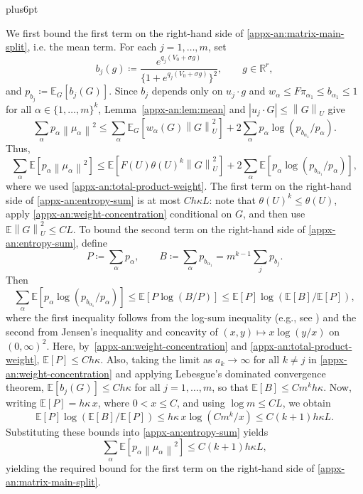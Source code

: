 \documentclass[11pt,letterpaper,twoside,leqno]{article}
\makeatletter
\theoremstyle{bookplain}
\theoremstyle{bookremark}
\renewenvironment{proof}[1][\proofname]{\par
  \pushQED{\qed}\normalfont\topsep6pt plus6pt\relax
  \trivlist\item[\hskip\labelsep\bfseries #1\@addpunct{.}]\ignorespaces
}{\popQED\endtrivlist\@endpefalse}
\newcommand{\E}{\mathbb E}
\newcommand{\R}{\mathbb R}
\newcommand{\norm}[1]{\left\lVert#1\right\rVert}
\makeatother
\begin{document}
\begin{proof}
We first bound the first term on the right-hand side of \eqref{appx-an:matrix-main-split}, i.e. the mean term.
For each $j=1,\dots, m$, set
\[
 b_j(g)\coloneqq
 \frac{e^{q_j(V_0+\sigma g)}}
 {\{1+e^{q_j(V_0+\sigma g)}\}^2},
 \qquad g\in\R^r,
 \]
 and \(p_{b_j}\coloneqq\E_G[b_j(G)]\).
Since $b_j$ depends only on $u_j\cdot g$ and
$w_\alpha\le F\pi_{\alpha_1}\le b_{\alpha_1}\leq 1$ for all $\alpha\in\{1,\dots, m\}^k$,
Lemma~\ref{appx-an:lem:mean} and
$|u_j\cdot G|\le\norm G_U$ give
\[
 \sum_\alpha p_\alpha\norm{\mu_\alpha}^2
 \le \sum_{\alpha}\E_G[w_{\alpha}(G)\norm G_U^2]
 +2\sum_\alpha p_\alpha
 \log(p_{b_{\alpha_1}}/p_\alpha).
\] 
Thus,
\begin{equation}
\sum_\alpha \E[p_\alpha\norm{\mu_\alpha}^2]
 \le \E[F(U)\theta(U)^k\norm G_U^2]
 +2\sum_\alpha \E[p_\alpha
 \log(p_{b_{\alpha_1}}/p_\alpha)],
 \label{appx-an:entropy-sum}
\end{equation}
where we used \eqref{appx-an:total-product-weight}.  The first term on the right-hand side of \eqref{appx-an:entropy-sum} is at most
$Ch{\kappa L}$: note that $\theta(U)^k \leq \theta(U)$, apply
\eqref{appx-an:weight-concentration} conditional on $G$, and then use $\E\norm G_U^2\le CL$.
To bound the second term on the right-hand side of \eqref{appx-an:entropy-sum}, 
define
\[
 P\coloneqq\sum_\alpha p_\alpha,\qquad
 B\coloneqq\sum_\alpha p_{b_{\alpha_1}}
 =m^{k-1}\sum_j p_{b_j}.
\]
Then
\[
 \sum_\alpha \E [p_\alpha
 \log(p_{b_{\alpha_1}}/p_\alpha)]
 \le \E[P\log(B/P)]
 \le \E[P]\log(\E[B]/\E[P]),
\]
where the first inequality follows from the log-sum inequality (e.g., see \cite[Theorem~2.7.1]{CoverThomas2006}) and the second from Jensen's inequality and concavity of $(x,y)\mapsto x\log(y/x)$ on $(0,\infty)^2$.
Here, by~\eqref{appx-an:weight-concentration} and \eqref{appx-an:total-product-weight}, $\E[P] \le Ch{\kappa}$. Also, taking the limit as $a_k\to\infty$ for all $k\neq j$ in \eqref{appx-an:weight-concentration} and applying Lebesgue's dominated convergence theorem, $\E[b_j(G)] \leq Ch{\kappa}$ for all $j=1,\dots, m$, so that  $\E[B] \le Cm^kh{\kappa}$.
Now, writing $\E[P] =h{\kappa}\,x$, where $0<x\le C$,
and using $\log m\le CL$, we obtain
\[
 \E[P]\log(\E[B]/\E[P])
 \le h{\kappa}\,x\log(Cm^k/x)
 \le C(k+1)h{\kappa L}.
\]
Substituting these bounds into \eqref{appx-an:entropy-sum} yields
\begin{equation}
  \sum_\alpha \E[p_\alpha\norm{\mu_\alpha}^2]
 \le C(k+1)h{\kappa L},
 \label{appx-an:tilted-mean-bound}
\end{equation}
yielding the required bound for the first term on the right-hand side of \eqref{appx-an:matrix-main-split}.


\end{proof}
\end{document}
